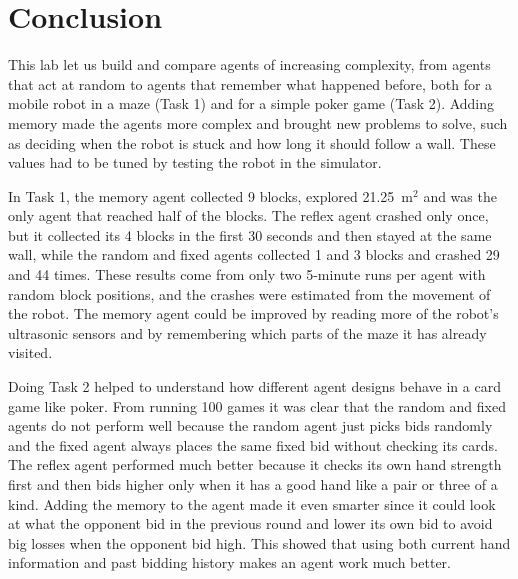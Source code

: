 \documentclass{article}
\begin{document}
\section*{Conclusion}

This lab let us build and compare agents of increasing complexity, from agents that act at random to agents that remember what happened before, both for a mobile robot in a maze (Task 1) and for a simple poker game (Task 2). Adding memory made the agents more complex and brought new problems to solve, such as deciding when the robot is stuck and how long it should follow a wall. These values had to be tuned by testing the robot in the simulator.

\medskip
In Task 1, the memory agent collected 9 blocks, explored 21.25~m$^2$ and was the only agent that reached half of the blocks. The reflex agent crashed only once, but it collected its 4 blocks in the first 30 seconds and then stayed at the same wall, while the random and fixed agents collected 1 and 3 blocks and crashed 29 and 44 times. These results come from only two 5-minute runs per agent with random block positions, and the crashes were estimated from the movement of the robot. The memory agent could be improved by reading more of the robot's ultrasonic sensors and by remembering which parts of the maze it has already visited.

\medskip
Doing Task 2 helped to understand how different agent designs behave in a card game like poker. From running 100 games it was clear that the random and fixed agents do not perform well because the random agent just picks bids randomly and the fixed agent always places the same fixed bid without checking its cards.
The reflex agent performed much better because it checks its own hand strength first and then bids higher only when it has a good hand like a pair or three of a kind. Adding the memory to the agent made it even smarter since it could look at what the opponent bid in the previous round and lower its own bid to avoid big losses when the opponent bid high. This showed that using both current hand information and past bidding history makes an agent work much better.
\end{document}
